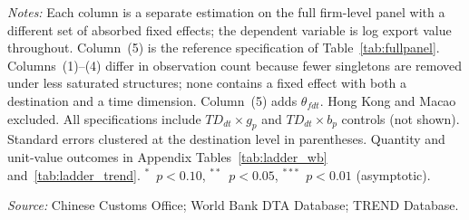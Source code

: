 \begin{table}[htbp]
\begin{threeparttable}
\begin{tablenotes}[flushleft]
\item \textit{Notes:} Each column is a separate estimation on the full firm-level panel with a different set of absorbed fixed effects; the dependent variable is log export value throughout. Column~(5) is the reference specification of Table~\ref{tab:fullpanel}. Columns~(1)--(4) differ in observation count because fewer singletons are removed under less saturated structures; none contains a fixed effect with both a destination and a time dimension. Column~(5) adds $\theta_{fdt}$. Hong Kong and Macao excluded. All specifications include $TD_{dt} \times g_p$ and $TD_{dt} \times b_p$ controls (not shown). Standard errors clustered at the destination level in parentheses. Quantity and unit-value outcomes in Appendix Tables~\ref{tab:ladder_wb} and~\ref{tab:ladder_trend}. $^{*}$~$p<0.10$, $^{**}$~$p<0.05$, $^{***}$~$p<0.01$ (asymptotic).
\item \textit{Source:} Chinese Customs Office; World Bank DTA Database; TREND Database.
\end{tablenotes}
\end{threeparttable}
\end{table}
